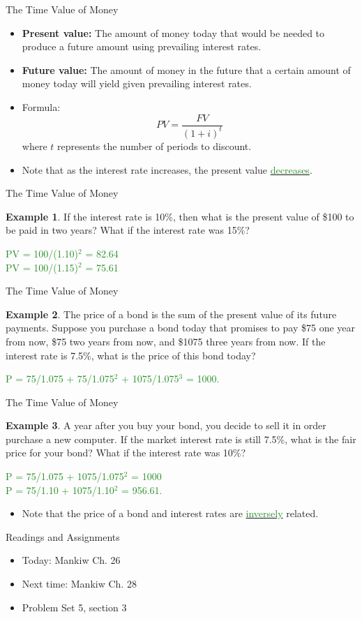 \documentclass[xcolor={dvipsnames},pdf, hyperref={colorlinks=true, citecolor=ForestGreen, linkcolor=BlueViolet, urlcolor=Magenta}]{beamer}
\theoremstyle{definition}
\newtheorem{exmp}{Example}[section]
\newcommand{\defn}[1]{\textbf{#1}}
\newcommand{\ddp}[1]{{\textcolor{ForestGreen}{#1}}}
\newcommand{\dd}[1]{{\underline{\textcolor{ForestGreen}{#1}}}}
\begin{document}
\begin{frame}{The Time Value of Money}
\begin{itemize}
	\item \defn{Present value:} The amount of money today that would be needed to produce a future amount using prevailing interest rates.
	
	\item \defn{Future value:} The amount of money in the future that a certain amount of money today will yield given prevailing interest rates.
	
	\item Formula: 
	\[PV = \frac{FV}{(1+i)^t}\] 
	where $t$ represents the number of periods to discount.
	
	\item Note that as the interest rate increases, the present value \dd{decreases}.
\end{itemize}
\end{frame}

\begin{frame}{The Time Value of Money}
\begin{exmp} If the interest rate is 10\%, then what is the present value of \$100 to be paid in two years? What if the interest rate was 15\%?
\end{exmp}

\ddp{\pause PV = 100/(1.10)$^2$ = 82.64 \\
	\pause PV = 100/(1.15)$^2$ = 75.61}

\end{frame}

\begin{frame}{The Time Value of Money}
\begin{exmp} 
	The price of a bond is the sum of the present value of its future payments. Suppose you purchase a bond today that promises to pay \$75 one year from now, \$75 two years from now, and \$1075 three years from now. If the interest rate is 7.5\%, what is the price of this bond today? 
\end{exmp}
\ddp{\pause P = 75/1.075 + 75/1.075$^2$ + 1075/1.075$^3$ = 1000.}
\end{frame}

\begin{frame}{The Time Value of Money}
\begin{exmp}
	A year after you buy your bond, you decide to sell it in order purchase a new computer. If the market interest rate is still 7.5\%, what is the fair price for your bond? What if the interest rate was 10\%?
\end{exmp}
\ddp{\pause P = 75/1.075 + 1075/1.075$^2$ = 1000 \\
\pause 	P = 75/1.10 + 1075/1.10$^2$ = 956.61.\\}
\begin{itemize}
	\item Note that the price of a bond and interest rates are \dd{inversely} related.
\end{itemize}
\end{frame}

\begin{frame}{Readings and Assignments}
\begin{itemize}
	\item Today: Mankiw Ch. 26
	\item Next time: Mankiw Ch. 28
	\item Problem Set 5, section 3
\end{itemize}
\end{frame}
\end{document}
